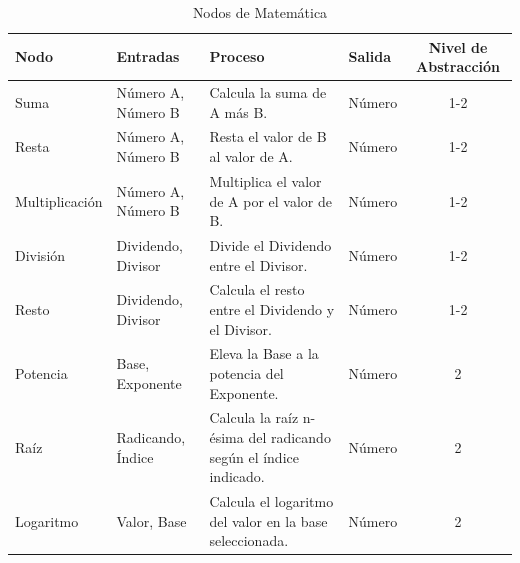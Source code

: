 \begin{table}[H]
    \centering
    \caption{Nodos de Matemática}
    \begin{tabularx}{\textwidth}{ l X X X c }
        \hline
        \textbf{Nodo}        & \textbf{Entradas}                                             & \textbf{Proceso}                                                                    & \textbf{Salida} & \textbf{Nivel de Abstracción} \\ \hline
        Suma                 & Número A, Número B                                            & Calcula la suma de A más B.                                                         & Número          & 1-2                           \\
        Resta                & Número A, Número B                                            & Resta el valor de B al valor de A.                                                  & Número          & 1-2                           \\
        Multiplicación       & Número A, Número B                                            & Multiplica el valor de A por el valor de B.                                         & Número          & 1-2                           \\
        División             & Dividendo, Divisor                                            & Divide el Dividendo entre el Divisor.                                               & Número          & 1-2                           \\
        Resto                & Dividendo, Divisor                                            & Calcula el resto entre el Dividendo y el Divisor.                                   & Número          & 1-2                           \\
        Potencia             & Base, Exponente                                               & Eleva la Base a la potencia del Exponente.                                          & Número          & 2                             \\
        Raíz                 & Radicando, Índice                                             & Calcula la raíz n-ésima del radicando según el índice indicado.                     & Número          & 2                             \\
        Logaritmo            & Valor, Base                                                   & Calcula el logaritmo del valor en la base seleccionada.                             & Número          & 2                             \\

\end{tabularx}
\end{table}

